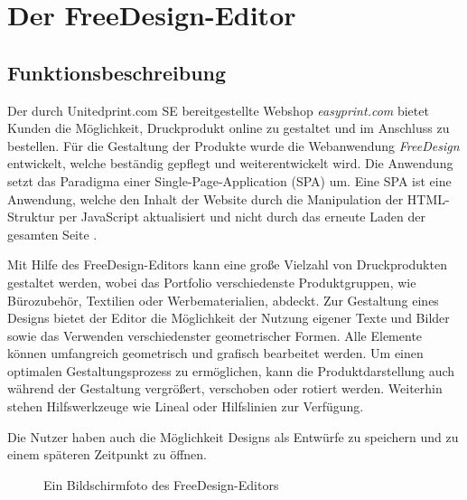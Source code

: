 \section{Der FreeDesign-Editor}
\label{Der FreeDesign-Editor}
\subsection{Funktionsbeschreibung}
Der durch Unitedprint.com SE bereitgestellte Webshop \emph{easyprint.com} bietet Kunden die Möglichkeit, Druckprodukt online zu gestaltet und im Anschluss zu bestellen. Für die Gestaltung der Produkte wurde die Webanwendung \emph{FreeDesign} entwickelt, welche beständig gepflegt und weiterentwickelt wird. 
Die Anwendung setzt das Paradigma einer Single-Page-Application (SPA) um. 
Eine SPA ist eine Anwendung, welche den Inhalt der Website durch die Manipulation der HTML-Struktur per JavaScript aktualisiert und nicht durch das erneute Laden der gesamten Seite \autocite[vgl.][497]{Flanagan2006}.  

Mit Hilfe des FreeDesign-Editors kann eine große Vielzahl von Druckprodukten gestaltet werden, wobei das Portfolio verschiedenste Produktgruppen, wie Bürozubehör, Textilien oder Werbematerialien, abdeckt. Zur Gestaltung eines Designs bietet der Editor die Möglichkeit der Nutzung eigener Texte und Bilder sowie das Verwenden verschiedenster geometrischer Formen. Alle Elemente können umfangreich geometrisch und grafisch bearbeitet werden. Um einen optimalen Gestaltungsprozess zu ermöglichen, kann die Produktdarstellung auch während der Gestaltung vergrößert, verschoben oder rotiert werden. Weiterhin stehen Hilfswerkzeuge wie Lineal oder Hilfslinien zur Verfügung. 

Die Nutzer haben auch die Möglichkeit Designs als Entwürfe zu speichern und zu einem späteren Zeitpunkt zu öffnen.

\begin{figure}[H]
    \centering
    \caption{Ein Bildschirmfoto des FreeDesign-Editors}
    \label{fig:Der FreeDesign-Editor}
\end{figure}

